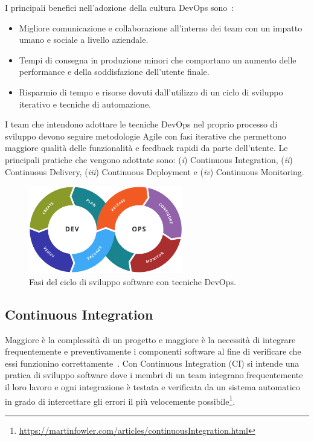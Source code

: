 I principali benefici nell'adozione della cultura DevOps sono~\cite{krief2019learning}:
\begin{itemize}
    \item Migliore comunicazione e collaborazione all'interno dei team con un impatto umano e sociale a livello aziendale.
    \item Tempi di consegna in produzione minori che comportano un aumento delle performance e della soddisfazione dell'utente finale.
    \item Risparmio di tempo e risorse dovuti dall'utilizzo di un ciclo di sviluppo iterativo e tecniche di automazione.
\end{itemize}

I team che intendono adottare le tecniche DevOps nel proprio processo di sviluppo devono seguire metodologie Agile con fasi iterative che permettono maggiore qualità delle funzionalità e feedback rapidi da parte dell'utente. Le principali pratiche che vengono adottate sono: (\textit{i}) Continuous Integration, (\textit{ii}) Continuous Delivery, (\textit{iii}) Continuous Deployment e (\textit{iv}) Continuous Monitoring.

\begin{figure}[H]
    \centering
    \includegraphics[width=0.6\textwidth]{img/Devops-toolchain.png}
    \caption{Fasi del ciclo di sviluppo software con tecniche DevOps.}
\end{figure}

\subsection{Continuous Integration}
Maggiore è la complessità di un progetto e maggiore è la necessità di integrare frequentemente e preventivamente i componenti software al fine di verificare che essi funzionino correttamente~\cite{duvall2007continuous}. Con Continuous Integration (CI) si intende una pratica di sviluppo software dove i membri di un team integrano frequentemente il loro lavoro e ogni integrazione è testata e verificata da un sistema automatico in grado di intercettare gli errori il più velocemente possibile\footnote{\href{https://martinfowler.com/articles/continuousIntegration.html}{https://martinfowler.com/articles/continuousIntegration.html}}.

